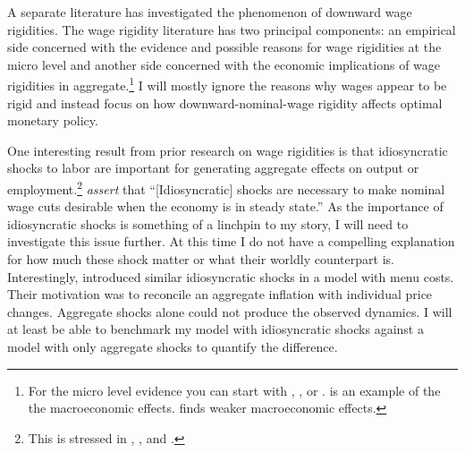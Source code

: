 \documentclass[12pt,a4paper]{article}            %
\begin{document}

A separate literature has investigated the phenomenon of downward wage rigidities.
The wage rigidity literature has two principal components: an empirical side concerned with the evidence and possible reasons for wage rigidities at the micro level and another side concerned with the economic implications of wage rigidities in aggregate.\footnote{For the micro level evidence you can start with \cite{dickens_et_al_2006}, \cite{akerlof_dickens_perry_1996}, or \cite{card_hyslop_1997}. \cite{erceg_henderson_levin_1999} is an example of the the macroeconomic effects.  \cite{elsby_2009} finds weaker macroeconomic effects.}
I will mostly ignore the reasons why wages appear to be rigid and instead focus on how downward-nominal-wage rigidity affects optimal monetary policy.

One interesting result from prior research on wage rigidities is that idiosyncratic shocks to labor are important for generating aggregate effects on output or employment.\footnote{This is stressed in \cite{elsby_2009}, \cite{benigno_ricci_2011}, and \cite{daly_hobijn_2013}.}
\cite{daly_hobijn_2013} \emph{assert} that ``[Idiosyncratic] shocks are necessary to make nominal wage cuts desirable when the economy is in steady state.''
As the importance of idiosyncratic shocks is something of a linchpin to my story, I will need to investigate this issue further.
At this time I do not have a compelling explanation for how much these shock matter or what their worldly counterpart is.
Interestingly, \cite{golosov_lucas_2007} introduced similar idiosyncratic shocks in a model with menu costs.
Their motivation was to reconcile an aggregate inflation with individual price changes.
Aggregate shocks alone could not produce the observed dynamics.
I will at least be able to benchmark my model with idiosyncratic shocks against a model with only aggregate shocks to quantify the difference.

\end{document}
